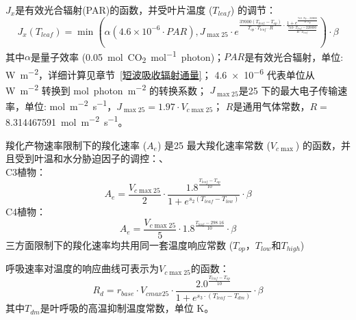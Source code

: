 $J_x$是有效光合辐射(PAR)的函数，并受叶片温度 ($T_{leaf}$) 的调节：
\begin{equation}
J_{x}\left(T_{{leaf }}\right)=\min \left(\alpha\left(4.6 \times 10^{-6} \cdot PAR\right), J_{\max 25}
 \cdot e^{\frac{37000\left(T_{{leaf }}-T_{o p}\right)}{T_{o p} \cdot T_{{leaf }} \cdot R} \cdot \frac{1+e^{\frac{710 \cdot T_{o p}-220000}
 {R \cdot T_{o p}}}}{\frac{710 \cdot T_{{leaf }}-220000}{R \cdot T_{{leaf }}}}}\right) \cdot \beta
\end{equation}
其中$\alpha$是量子效率 (\qty{0.05}{mol.CO_2.mol^{-1}.photon})；$PAR$是有效光合辐射，单位: \unit{W.m^{-2}}，详细计算见章节~\ref{短波吸收辐射通量}；
\num{4.6e-6} 代表单位从 \unit{W.m^{-2}} 转换到 \unit{mol.photon.m^{-2}} 的转换系数；
$J_{\max 25}$是25 \textcelsius 下的最大电子传输速率，单位: \unit{mol.m^{-2}.s^{-1}}，$J_{\max 25}=1.97 \cdot V_{c \max 25}$； 
$R$是通用气体常数，$R=$ \qty{8.314467591}{mol.m^{-2}.s^{-1}}。

羧化产物速率限制下的羧化速率 ($A_e$) 是25 \textcelsius 最大羧化速率常数 ($V_{c \max}$) 的函数，并且受到叶温和水分胁迫因子的调控：、\\
C3植物：\\
\begin{equation}\label{A_e_a}
A_e=\frac{V_{c \max 25}}{2} \cdot \frac{1.8^{\frac{T_{{leaf }}-T_{o p}}{10}}}{1+e^{s_{2}\left(T_{{leaf }}-T_{{low }}\right)}} \cdot \beta
\end{equation}
C4植物：\\
\begin{equation}\label{A_e_b}
A_e=\frac{V_{c \max 25}}{5} \cdot 1.8^{\frac{T_{{leaf }}-298.16}{10}} \cdot \beta
\end{equation}
三方面限制下的羧化速率均共用同一套温度响应常数 ($T_{op}$，$T_{low}$和$T_{high}$)


呼吸速率对温度的响应曲线可表示为$V_{c \max25}$的函数：
\begin{equation}\label{R_d1}
R_{d}=r_{{base }} \cdot V_{cmax 25} \cdot \frac{2.0^{\frac{T_{leaf}-T_{op}}{10}}}{1+e^{s_3 \cdot\left(T_{leaf}-T_{d m}\right)}} \cdot \beta
\end{equation}
其中$T_{dm}$是叶呼吸的高温抑制温度常数，单位 K。




